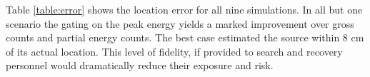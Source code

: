 Table \ref{table:error} shows the location error for all nine simulations. In all but one scenario the gating on the peak energy yields a marked improvement over gross counts and partial energy counts. The best case estimated the source within 8 cm of its actual location. This level of fidelity, if provided to search and recovery personnel would dramatically reduce their exposure and risk.
